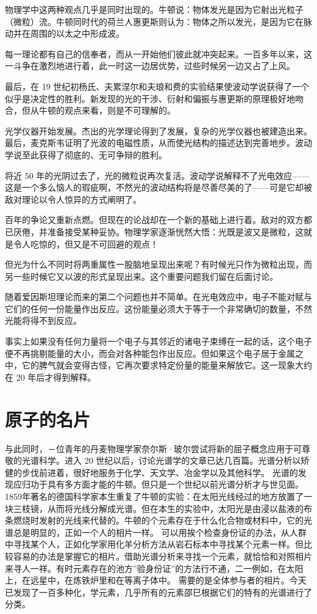 物理学中这两种观点几乎是同时出现的。牛顿说：物体发光是因为它射出光粒子（微粒）流。牛顿同时代的荷兰人惠更斯则认为：物体之所以发光，是因为它在脉动并在周围的以太之中形成波。

每一理论都有自己的信奉者，而从一开始他们彼此就冲突起来。一百多年以来，这一斗争在激烈地进行着，此一时这一边居优势，过些时候另一边又占了上风。

最后，在 19 世纪初杨氏、夫累涅尔和夫琅和费的实验结果使波动学说获得了一个似乎是决定性的胜利。新发现的光的干涉、衍射和偏振与惠更斯的原理极好地吻合，但从牛顿的观点来看，则是不可理解的。

光学仪器开始发展。杰出的光学理论得到了发展，复杂的光学仪器也被建造出来。最后，麦克斯韦证明了光波的电磁性质，从而使光结构的描述达到完善地步。波动学说至此获得了彻底的、无可争辩的胜利。

将近 50 年的光阴过去了，光的微粒说再次复活。波动学说解释不了光电效应——这是一个多么恼人的瑕疵啊，不然光的波动结构将是尽善尽美的了——可是它却被敌对理论以令人惊异的方式阐明了。

百年的争论又重新点燃。但现在的论战却在一个新的基础上进行着。敌对的双方都已厌倦，并准备接受某种妥协。物理学家逐渐恍然大悟：光既是波又是微粒，这就是令人吃惊的，但又是不可回避的观点！

但光为什么不同时将两重属性一股脑地呈现出来呢？有时候光只作为微粒出现，而另一些时候它又以波的形式呈现出来。这个重要问题我们留在后面讨论。

随着爱因斯坦理论而来的第二个问题也并不简单。在光电效应中，电子不能对赋与它们的任何一份能量作出反应。这份能量必须大于等于一个非常确切的数量，不然光能将得不到反应。

事实上如果没有任何力量将一个电子与其邻近的诸电子束缚在一起的话，这个电子便不再挑剔能量的大小，而会对各种能包作出反应。但如果这个电子居于金属之中，它的脾气就会变得古怪，它再次要求特定份量的能量来解放它。这一现象大约在 20 年后才得到解释。

\section{原子的名片}

与此同时，－位青年的丹麦物理学家奈尔斯·玻尔尝试将新的屈子概念应用于可尊敬的光谱科学。进入 20 世纪以后，讨论光谱学的文章已达几百篇。光谱分析以矫健的步伐前进着，很好地服务于化学、天文学、冶金学以及其他科学。
光谱的发现应归功于具有多方面才能的牛顿。但只是一个世纪以前光谱分析才与世见面。1859年著名的德国科学家本生重复了牛顿的实验：在太阳光线经过的地方放置了一块三枝镜，从而将光线分解成光谱。但在本生的实验中，太阳光是由浸以盐液的布条燃烧时发射的光线来代替的。牛顿的个元素存在于什么化合物或材料中，它的光谱总是明显的，正如一个人的相片一样。
可以用挨个检查身份证的办法，从人群中寻找某个人，正如化学家用化羊分析方法从岩石标本中寻找某个元素一样。但比较容易的办法是掌握它的相片。借助光谱分析来寻找一个元素，就恰恰和对照相片来寻人一祥。有时元素存在的池方”验身份证”的方法行不通，二一例如，在太阳上，在远星中，在炼铁炉里和在等离子体中。
需要的是全体参与者的相片。今天已发现了一百多种化，学元素，几乎所有的元素邵巳根据它们的特有的光谱进行了分类。

